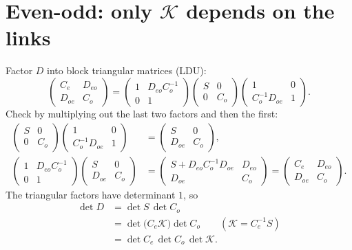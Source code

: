 \documentclass[11pt,a4paper]{article}
\numberwithin{equation}{section}
\newcommand{\Ce}{C_{e}}
\newcommand{\Co}{C_{o}}
\begin{document}
\section{Even-odd: only $\mathcal K$ depends on the links}
Factor $D$ into block triangular matrices (LDU):
\begin{equation}
\begin{pmatrix}\Ce&D_{eo}\\D_{oe}&\Co\end{pmatrix}
=\begin{pmatrix}1&D_{eo}\Co^{-1}\\0&1\end{pmatrix}
\begin{pmatrix}S&0\\0&\Co\end{pmatrix}
\begin{pmatrix}1&0\\\Co^{-1}D_{oe}&1\end{pmatrix}.
\end{equation}
Check by multiplying out the last two factors and then the first:
\begin{align}
\begin{pmatrix}S&0\\0&\Co\end{pmatrix}\begin{pmatrix}1&0\\\Co^{-1}D_{oe}&1\end{pmatrix}
&=\begin{pmatrix}S&0\\D_{oe}&\Co\end{pmatrix},\nonumber\\
\begin{pmatrix}1&D_{eo}\Co^{-1}\\0&1\end{pmatrix}\begin{pmatrix}S&0\\D_{oe}&\Co\end{pmatrix}
&=\begin{pmatrix}S+D_{eo}\Co^{-1}D_{oe}&D_{eo}\\D_{oe}&\Co\end{pmatrix}
=\begin{pmatrix}\Ce&D_{eo}\\D_{oe}&\Co\end{pmatrix}.
\end{align}
The triangular factors have determinant $1$, so
\begin{align}
\det D&=\det S\,\det\Co\nonumber\\
&=\det\big(\Ce \mathcal K\big)\det\Co\qquad(\mathcal K=\Ce^{-1}S)\nonumber\\
&=\det\Ce\,\det\Co\,\det \mathcal K .
\end{align}
\end{document}
